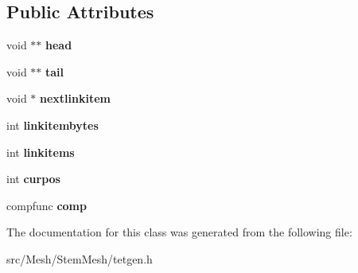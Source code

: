 \subsection*{Public Attributes}
\begin{DoxyCompactItemize}
\item 
\mbox{\label{classStemMesh3D_1_1tetgenmesh_1_1link_a53b1ba6a5730bdf9722bc03bae7b3c8c}} 
void $\ast$$\ast$ {\bfseries head}
\item 
\mbox{\label{classStemMesh3D_1_1tetgenmesh_1_1link_a484da4ef25442b2ac63735ecbce3cea6}} 
void $\ast$$\ast$ {\bfseries tail}
\item 
\mbox{\label{classStemMesh3D_1_1tetgenmesh_1_1link_a363ae663ff1b1c3cd16dc1c1904f1373}} 
void $\ast$ {\bfseries nextlinkitem}
\item 
\mbox{\label{classStemMesh3D_1_1tetgenmesh_1_1link_a40b91c0d17c55e01f2808309425ba879}} 
int {\bfseries linkitembytes}
\item 
\mbox{\label{classStemMesh3D_1_1tetgenmesh_1_1link_aaa3c5b3544876a23f40cd0e1995e0cd5}} 
int {\bfseries linkitems}
\item 
\mbox{\label{classStemMesh3D_1_1tetgenmesh_1_1link_abba8c83d0ee67ffa4f486e6dee9e5ffe}} 
int {\bfseries curpos}
\item 
\mbox{\label{classStemMesh3D_1_1tetgenmesh_1_1link_a0a4de95c2ededd5ec762cbc6c73ceb0c}} 
compfunc {\bfseries comp}
\end{DoxyCompactItemize}


The documentation for this class was generated from the following file\+:\begin{DoxyCompactItemize}
\item 
src/\+Mesh/\+Stem\+Mesh/tetgen.\+h\end{DoxyCompactItemize}
